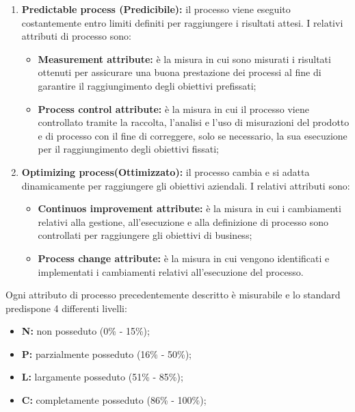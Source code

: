 \begin{enumerate}
\begin{itemize}
	\end{itemize}
	\item \textbf{Predictable process (Predicibile):} il processo viene eseguito costantemente entro limiti definiti per raggiungere i risultati attesi. I relativi attributi di processo sono:
	\begin{itemize}
		\item \textbf{Measurement attribute:} è la misura in cui sono misurati i risultati ottenuti per assicurare una buona prestazione dei processi al fine di garantire il raggiungimento degli obiettivi prefissati;
		\item \textbf{Process control attribute:} è la misura in cui il processo viene controllato tramite la raccolta, l’analisi e l’uso di misurazioni del prodotto e di processo con il fine di correggere, solo se necessario, la sua esecuzione per il raggiungimento degli obiettivi fissati;
	\end{itemize}
	\item \textbf{Optimizing process(Ottimizzato):} il processo cambia e si adatta dinamicamente per raggiungere gli obiettivi aziendali. I relativi attributi sono:
	\begin{itemize}
		\item \textbf{Continuos improvement attribute:} è la misura in cui i cambiamenti relativi alla gestione, all’esecuzione e alla definizione di processo sono controllati per raggiungere gli obiettivi di business;
		\item \textbf{Process change attribute:} è la misura in cui vengono identificati e implementati i cambiamenti relativi all’esecuzione del processo.
	\end{itemize}
\end{enumerate}
Ogni attributo di processo precedentemente descritto è misurabile e lo standard predispone 4 differenti livelli:
\begin{itemize}
	\item \textbf{N:} non posseduto (0\% - 15\%);
	\item \textbf{P:} parzialmente posseduto (16\% - 50\%);
	\item \textbf{L:} largamente posseduto (51\% - 85\%);
	\item \textbf{C:} completamente posseduto (86\% - 100\%);
\end{itemize}

\pagebreak
